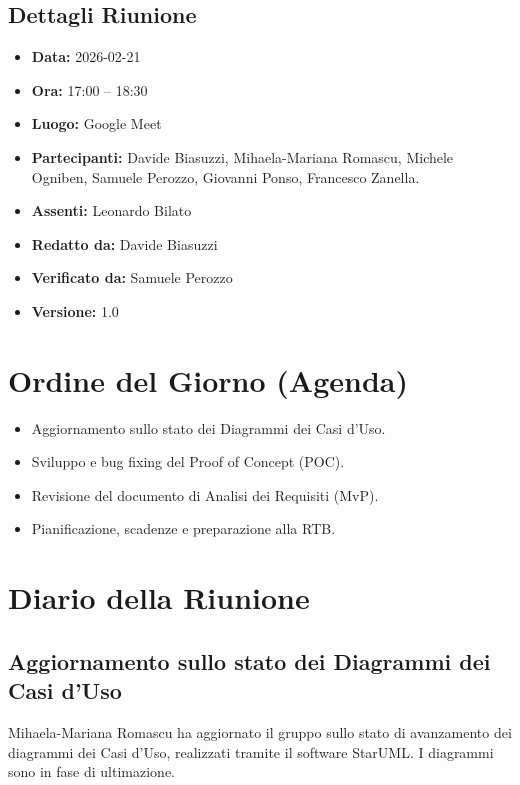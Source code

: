 \documentclass[a4paper, 11pt, oneside]{scrartcl}
\begin{document}
\subsection{Dettagli Riunione}
\begin{itemize}
    \item \textbf{Data:} 2026-02-21
    \item \textbf{Ora:} 17:00 -- 18:30
    \item \textbf{Luogo:} Google Meet
    \item \textbf{Partecipanti:} Davide Biasuzzi, Mihaela-Mariana Romascu, Michele Ogniben, Samuele Perozzo, Giovanni Ponso, Francesco Zanella.
    \item \textbf{Assenti:} Leonardo Bilato
    \item \textbf{Redatto da:} Davide Biasuzzi
    \item \textbf{Verificato da:} Samuele Perozzo
    \item \textbf{Versione:} 1.0
\end{itemize}

\newpage
\section{Ordine del Giorno (Agenda)}
\begin{itemize}
    \item[1.] Aggiornamento sullo stato dei Diagrammi dei Casi d'Uso.
    \item[2.] Sviluppo e bug fixing del Proof of Concept (POC).
    \item[3.] Revisione del documento di Analisi dei Requisiti (MvP).
    \item[4.] Pianificazione, scadenze e preparazione alla RTB.
\end{itemize}

\newpage
\section{Diario della Riunione}

\subsection{Aggiornamento sullo stato dei Diagrammi dei Casi d'Uso}
Mihaela-Mariana Romascu ha aggiornato il gruppo sullo stato di avanzamento dei diagrammi dei Casi d'Uso, realizzati tramite il software StarUML. I diagrammi sono in fase di ultimazione.
\end{document}
